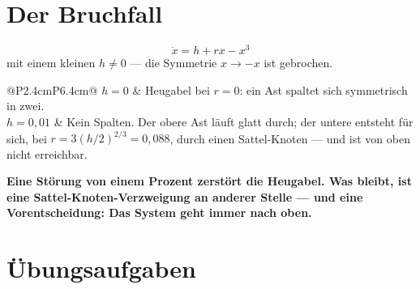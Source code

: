 \section{Der Bruchfall}

\begin{warnung}
\[ \dot x = h + rx - x^{3} \]
mit einem kleinen $h \ne 0$ --- die Symmetrie $x \to -x$ ist gebrochen.

\begin{center}
{\small
\renewcommand{\arraystretch}{1.5}
\begin{tabular}{@{}P{2.4cm}P{6.4cm}@{}}
\toprule
$h = 0$ & Heugabel bei $r = 0$: ein Ast spaltet sich symmetrisch in zwei.\\
$h = 0{,}01$ & Kein Spalten. Der obere Ast läuft glatt durch; der untere entsteht für sich, bei $r = 3(h/2)^{2/3} = 0{,}088$, durch einen Sattel-Knoten --- und ist von oben nicht erreichbar.\\
\bottomrule
\end{tabular}}
\end{center}

\begin{center}
\begin{minipage}{0.9\textwidth}
\textbf{Eine Störung von einem Prozent zerstört die Heugabel. Was bleibt, ist eine Sattel-Knoten-Verzweigung an anderer Stelle --- und eine Vorentscheidung: Das System geht immer nach oben.}
\end{minipage}
\end{center}

\begin{center}
\begin{minipage}{0.88\textwidth}
\end{minipage}
\end{center}
\end{warnung}

\section{Übungsaufgaben}

